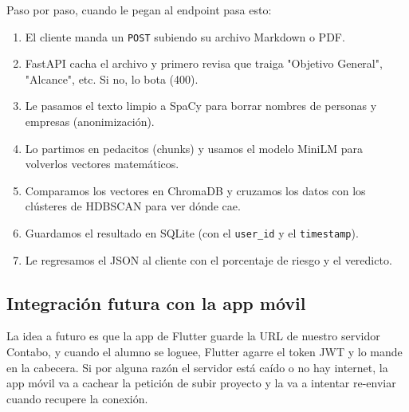 Paso por paso, cuando le pegan al endpoint pasa esto:
\begin{enumerate}
  \item El cliente manda un \texttt{POST} subiendo su archivo Markdown o PDF.
  \item FastAPI cacha el archivo y primero revisa que traiga "Objetivo General", "Alcance", etc. Si no, lo bota (400).
  \item Le pasamos el texto limpio a SpaCy para borrar nombres de personas y empresas (anonimización).
  \item Lo partimos en pedacitos (chunks) y usamos el modelo MiniLM para volverlos vectores matemáticos.
  \item Comparamos los vectores en ChromaDB y cruzamos los datos con los clústeres de HDBSCAN para ver dónde cae.
  \item Guardamos el resultado en SQLite (con el \texttt{user\_id} y el \texttt{timestamp}).
  \item Le regresamos el JSON al cliente con el porcentaje de riesgo y el veredicto.
\end{enumerate}

\subsection{Integración futura con la app móvil}

La idea a futuro es que la app de Flutter guarde la URL de nuestro servidor Contabo, y cuando el alumno se loguee, Flutter agarre el token JWT y lo mande en la cabecera. Si por alguna razón el servidor está caído o no hay internet, la app móvil va a cachear la petición de subir proyecto y la va a intentar re-enviar cuando recupere la conexión.
